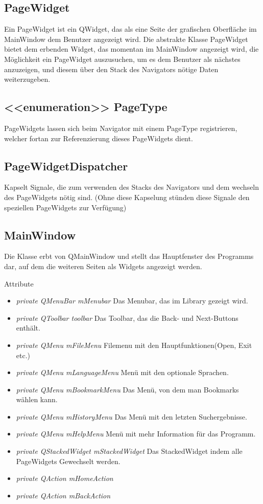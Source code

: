 \subsection*{PageWidget}
Ein PageWidget ist ein QWidget, das als eine Seite der grafischen Oberfläche im MainWindow dem Benutzer angezeigt wird. Die abstrakte Klasse PageWidget bietet dem erbenden Widget, das momentan im MainWindow angezeigt wird, die Möglichkeit ein PageWidget auszusuchen, um es dem Benutzer als nächstes anzuzeigen, und diesem über den Stack des Navigators nötige Daten weiterzugeben.

\subsection*{<<enumeration>> PageType}
PageWidgets lassen sich beim Navigator mit einem PageType registrieren, welcher fortan zur Referenzierung dieses PageWidgets dient.

\subsection*{PageWidgetDispatcher}
Kapselt Signale, die zum verwenden des Stacks des Navigators und dem wechseln des PageWidgets nötig sind. (Ohne diese Kapselung stünden diese Signale den speziellen PageWidgets zur Verfügung)

\subsection*{MainWindow}
Die Klasse erbt von QMainWindow und stellt das Hauptfenster des Programms dar, auf dem die weiteren Seiten als Widgets angezeigt werden.

Attribute
\begin{itemize}
	\item\textit{private QMenuBar mMenubar}
	Das Menubar, das im Library gezeigt wird.   
	\item\textit{private QToolbar toolbar}
	Das Toolbar, das die Back- und Next-Buttons enthält.
	\item\textit{private QMenu mFileMenu}
	Filemenu mit den Hauptfunktionen(Open, Exit etc.)
	\item\textit{private QMenu mLanguageMenu}
	Menü mit den optionale Sprachen.
	\item\textit{private QMenu mBookmarkMenu}
	Das Menü, von dem man Bookmarks wählen kann.
	\item\textit{private QMenu mHistoryMenu}
	Das Menü mit den letzten Suchergebnisse.
	\item\textit{private QMenu mHelpMenu}
	Menü mit mehr Information für das Programm.
	\item\textit{private QStackedWidget mStackedWidget}
	Das StackedWidget indem alle PageWidgets Gewechselt werden.
	\item\textit{private QAction mHomeAction}
	\item\textit{private QAction mBackAction}
\end{itemize}

